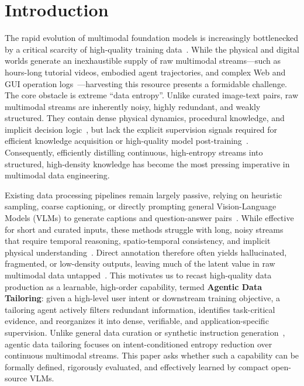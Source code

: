 \section{Introduction}

The rapid evolution of multimodal foundation models is increasingly bottlenecked by a critical scarcity of high-quality training data~\cite{qwen2.5vl, qwen3vl,llava,gpt4o,gpt4,gemini,gemini2.5,gpt5,claude,minimax,wan2025,seedance2}. While the physical and digital worlds generate an inexhaustible supply of raw multimodal streams—such as hours-long tutorial videos, embodied agent trajectories, and complex Web and GUI operation logs~\cite{grauman2022ego4d,savva2019habitat,dai2017scannet,androidinthewild,androidworld,mind2web}—harvesting this resource presents a formidable challenge. The core obstacle is extreme ``data entropy''. Unlike curated image-text pairs, raw multimodal streams are inherently noisy, highly redundant, and weakly structured. They contain dense physical dynamics, procedural knowledge, and implicit decision logic~\cite{grauman2022ego4d,Ego-exo4d,miech2019howto100m,savva2019habitat,osworld,mind2web}, but lack the explicit supervision signals required for efficient knowledge acquisition or high-quality model post-training~\cite{textbooks,lima,sharegpt4v,llavaonevision}. Consequently, efficiently distilling continuous, high-entropy streams into structured, high-density knowledge has become the most pressing imperative in multimodal data engineering.

Existing data processing pipelines remain largely passive, relying on heuristic sampling, coarse captioning, or directly prompting general Vision-Language Models (VLMs) to generate captions and question-answer pairs~\cite{sharegpt4v,gao2024sphinx,chen2023minigptv2}. While effective for short and curated inputs, these methods struggle with long, noisy streams that require temporal reasoning, spatio-temporal consistency, and implicit physical understanding~\cite{vlm2bench,vsibench,mmsibench,disheng2024thinking,mico,li2025viewspatial}. Direct annotation therefore often yields hallucinated, fragmented, or low-density outputs, leaving much of the latent value in raw multimodal data untapped~\cite{hallusionbench,evaluating}. This motivates us to recast high-quality data production as a learnable, high-order capability, termed \textbf{Agentic Data Tailoring}: given a high-level user intent or downstream training objective, a tailoring agent actively filters redundant information, identifies task-critical evidence, and reorganizes it into dense, verifiable, and application-specific supervision. Unlike general data curation or synthetic instruction generation~\cite{data-centric-survey,dataperf,selfinstruct,wizardlm,orca,lima,alpagasus}, agentic data tailoring focuses on intent-conditioned entropy reduction over continuous multimodal streams. This paper asks whether such a capability can be formally defined, rigorously evaluated, and effectively learned by compact open-source VLMs.


